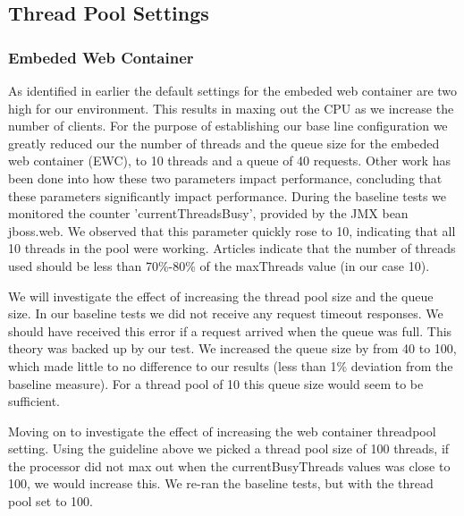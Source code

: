 \subsection*{Thread Pool Settings}

\subsubsection*{Embeded Web Container}

As identified in earlier the default settings for the embeded web container are two high for our environment. This results in maxing out the CPU as we increase the number of clients. For the purpose of establishing our base line configuration we greatly reduced our the number of threads and the queue size for the embeded web container (EWC), to 10 threads and a queue of 40 requests. Other work has been done into how these two parameters impact performance\cite{model_server_settings_jee}, concluding that these parameters significantly impact performance. During the baseline tests we monitored the counter 'currentThreadsBusy', provided by the JMX bean jboss.web. We observed that this parameter quickly rose to 10, indicating that all 10 threads in the pool were working. Articles indicate that the number of threads used should be less than 70\%-80\% of the maxThreads value (in our case 10)\cite{master_the_boss}. 

We will investigate the effect of increasing the thread pool size and the queue size. In our baseline tests we did not receive any request timeout responses. We should have received this error if a request arrived when the queue was full. This theory was backed up by our test. We increased the queue size by from 40 to 100, which made little to no difference to our results (less than 1\% deviation from the baseline measure). For a thread pool of 10 this queue size would seem to be sufficient.

Moving on to investigate the effect of increasing the web container threadpool setting. Using the guideline above we picked a thread pool size of 100 threads, if the processor did not max out when the currentBusyThreads values was close to 100, we would increase this. We re-ran the baseline tests, but with the thread pool set to 100.

